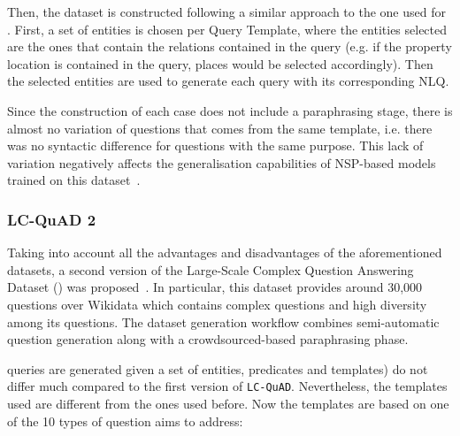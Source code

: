 Then, the dataset is constructed following a similar approach to the one used for \LCQuADone{}. 
First, a set of entities is chosen per Query Template, where the entities selected are the ones 
that contain the relations contained in the query (e.g. if the property location is contained 
in the query, places would be selected accordingly). Then the selected entities are used to 
generate each \SPARQL{} query with its corresponding NLQ. 

Since the construction of each case does not include a paraphrasing stage, there is almost no 
variation of questions that comes from the same template, i.e. there was no syntactic 
difference for questions with the same purpose. This lack of variation negatively affects the 
generalisation capabilities of NSP-based models trained on this dataset~\cite{qa:BerantL14}.

\subsubsection{LC-QuAD 2}
\label{cap2:theoFrame/qakg/benchmarkDatasets/lcquad2}
Taking into account all the advantages and disadvantages of the aforementioned datasets, a 
second version of the Large-Scale Complex Question Answering Dataset (\LCQuADtwo{}) was 
proposed~\cite{dataset:lcquad2-DubeyBA019}. In particular, this dataset provides around 30,000 
questions over Wikidata which contains complex questions and high diversity among its questions. 
The dataset generation workflow combines semi-automatic question generation along with a 
crowdsourced-based paraphrasing phase.

\SPARQL{} queries are generated given a set of entities, predicates and templates) do not differ 
much compared to the first version of \texttt{LC-QuAD}. Nevertheless, the \SPARQL{} templates used 
are different from the ones used before. Now the templates are based on one of the 10 types of 
question \LCQuADtwo{} aims to address:

